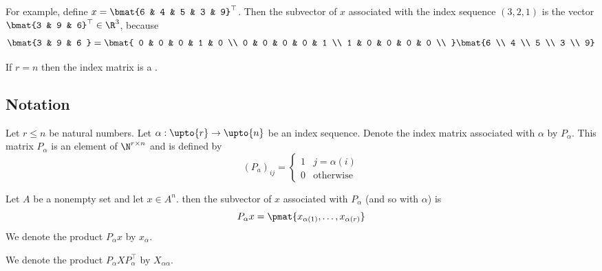 For example, define $x = \bmat{6 & 4 & 5 & 3 & 9}^\top $.
Then the subvector of $x$ associated with the index sequence $(3, 2, 1)$ is the vector $\bmat{3 & 9 & 6}^\top  \in \R ^3$, because
\[
\bmat{3 & 9 & 6 } =
\bmat{
0 & 0 & 0 & 1 & 0 \\
0 & 0 & 0 & 0 & 1 \\
1 & 0 & 0 & 0 & 0 \\
}\bmat{6 \\ 4 \\ 5 \\ 3 \\ 9}
\]

If $r = n$ then the index matrix is a .

\subsection*{Notation}

Let $r \leq n$ be natural numbers.
Let $\alpha : \upto{r} \to \upto{n}$ be an index sequence.
Denote the index matrix associated with $\alpha $ by $P_\alpha $.
This matrix $P_\alpha $ is an element of $\N  ^{r \times  n}$ and is defined by
\[
(P_a)_{ij} = \begin{cases}
1 & j = \alpha (i) \\
0 & \text{otherwise}
\end{cases}
\]

Let $A$ be a nonempty set and let $x \in A^n$.
then the subvector of $x$ associated with $P_\alpha $ (and so with $\alpha $) is
\[
P_\alpha  x = \pmat{x_{\alpha (1)}, \dots , x_{\alpha (r)}}
\]
We denote the product $P_\alpha x$ by $x_{\alpha }$.

We denote the product $P_\alpha  X P_\alpha ^\top $ by $X_{\alpha \alpha }$.
